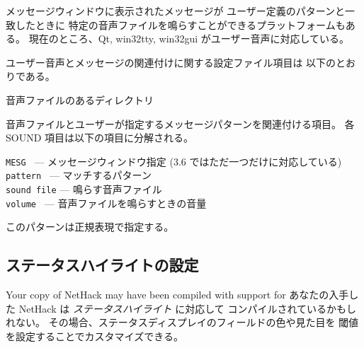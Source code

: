 メッセージウィンドウに表示されたメッセージが
ユーザー定義のパターンと一致したときに
特定の音声ファイルを鳴らすことができるプラットフォームもある。
現在のところ、Qt, win32tty, win32gui がユーザー音声に対応している。

ユーザー音声とメッセージの関連付けに関する設定ファイル項目は
以下のとおりである。

\blist{}
\item[\ib{SOUNDDIR}]
音声ファイルのあるディレクトリ
\item[\ib{SOUND}]
音声ファイルとユーザーが指定するメッセージパターンを関連付ける項目。
各 SOUND 項目は以下の項目に分解される。

{\tt MESG      } --- メッセージウィンドウ指定 (3.6 ではただ一つだけに対応している)\\
{\tt pattern   } --- マッチするパターン\\
{\tt sound file} --- 鳴らす音声ファイル\\
{\tt volume    } --- 音声ファイルを鳴らすときの音量
\elist

このパターンは正規表現で指定する。

\subsection*{ステータスハイライトの設定}

Your copy of NetHack may have been compiled with support for 
あなたの入手した NetHack は {\it ステータスハイライト} に対応して
コンパイルされているかもしれない。
その場合、ステータスディスプレイのフィールドの色や見た目を
閾値を設定することでカスタマイズできる。

